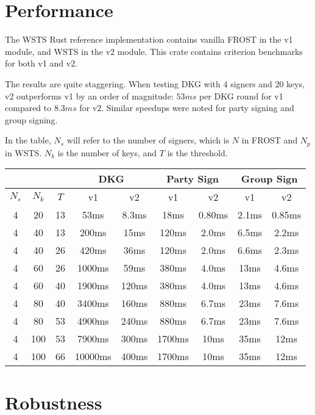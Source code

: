 \documentclass{article}
\begin{document}
\newpage
\onecolumn
\section{
  Performance
}

The WSTS Rust reference implementation \cite{tmfrost} contains vanilla FROST in the v1 module, and WSTS in the v2 module.  This crate contains criterion benchmarks for both v1 and v2.

The results are quite staggering.  When testing DKG with $4$ signers and $20$ keys, v2 outperforms v1 by an order of magnitude: $53 ms$ per DKG round for v1 compared to $8.3 ms$ for v2.  Similar speedups were noted for party signing and group signing.

In the table, $N_s$ will refer to the number of signers, which is $N$ in FROST and $N_p$ in WSTS.  $N_k$ is the number of keys, and $T$ is the threshold.

\begin{center}
  \begin{tabular}{ c|c|c|c|c|c|c|c|c } 
    \multicolumn{3}{c|}{} & \multicolumn{2}{|c|}{DKG}& \multicolumn{2}{|c|}{Party Sign} & \multicolumn{2}{|c}{Group Sign} \\
    \hline
    \hline
    $N_s$ & $N_k$ & $T$ & v1 & v2 & v1 & v2 & v1 & v2 \\ 
    \hline
    \hline
    4 & 20 & 13 & 53ms & 8.3ms & 18ms & 0.80ms & 2.1ms & 0.85ms \\ 
    4 & 40 & 13 & 200ms & 15ms & 120ms & 2.0ms & 6.5ms & 2.2ms \\ 
    4 & 40 & 26 & 420ms & 36ms & 120ms & 2.0ms & 6.6ms & 2.3ms \\ 
    4 & 60 & 26 & 1000ms & 59ms & 380ms & 4.0ms & 13ms & 4.6ms \\ 
    4 & 60 & 40 & 1900ms & 120ms & 380ms & 4.0ms & 13ms & 4.6ms \\ 
    4 & 80 & 40 & 3400ms & 160ms & 880ms & 6.7ms & 23ms & 7.6ms \\ 
    4 & 80 & 53 & 4900ms & 240ms & 880ms & 6.7ms & 23ms & 7.6ms \\ 
    4 & 100 & 53 & 7900ms & 300ms & 1700ms & 10ms & 35ms & 12ms \\ 
    4 & 100 & 66 & 10000ms & 400ms & 1700ms & 10ms & 35ms & 12ms \\ 
  \end{tabular}
\end{center}

\section{
  Robustness
}
\end{document}
